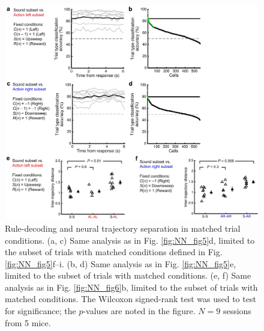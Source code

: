 \begin{figure}[htbp]

\begin{center}
\includegraphics[width=\textwidth]{Figures/Chapter3/NN_figS7.jpg} 
\end{center}

\caption[Rule-decoding and neural trajectory separation in matched trial conditions]
{Rule-decoding and neural trajectory separation in matched trial conditions.
(a, c) Same analysis as in Fig. \ref{fig:NN_fig5}d, limited to the subset of trials with matched conditions defined in Fig. \ref{fig:NN_fig5}f--i. (b, d) Same analysis as in Fig. \ref{fig:NN_fig5}e, limited to the subset of trials with matched conditions. (e, f) Same analysis as in Fig. \ref{fig:NN_fig6}b, limited to the subset of trials with matched conditions. The Wilcoxon signed-rank test was used to test for significance; the $p$-values are noted in the figure. $N = 9$ sessions from 5 mice.}

\label{fig:NN_figS7}
\end{figure}